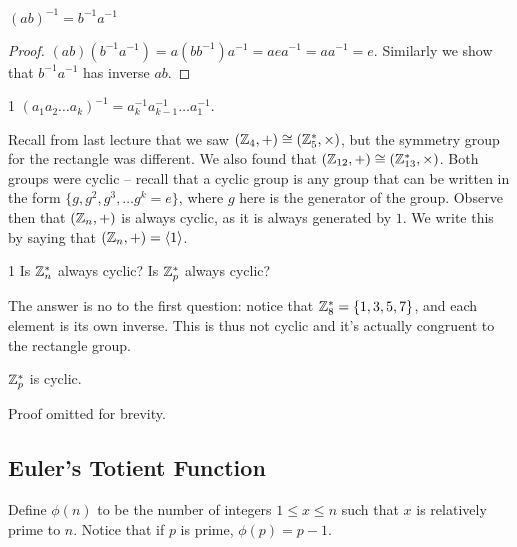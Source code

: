 \begin{theorem}
$(ab)^{-1} = b^{-1}a^{-1}$
\end{theorem}
\begin{proof}
$(ab)(b^{-1}a^{-1}) = a(b b^{-1}) a^{-1} = aea^{-1} = aa^{-1} = e$. Similarly we show that $b^{-1}a^{-1}$ has inverse $ab$. 
\end{proof}

\begin{corollary}1
    $(a_1 a_2 \ldots a_k)^{-1} = a_k^{-1} a_{k-1}^{-1} \ldots a_1^{-1}$. 
\end{corollary}

Recall from last lecture that we saw $(\mathbb{Z}_4, +) \cong (\mathbb{Z}_5^*, \times)$, but the symmetry group for the rectangle was different. We also found that $(\mathbb{Z}_{12}, +) \cong (\mathbb{Z}_{13}^*, \times)$. 
Both groups were cyclic -- recall that a cyclic group is any group that can be written in the form $\{g, g^2, g^3, \ldots g^k = e\}$, where $g$ here is the generator of the group. Observe then that $(\mathbb{Z}_n, +)$ is always cyclic, as it is always generated by $1$. We write this by saying that $(\mathbb{Z}_n, +) = \langle 1 \rangle$. 

\begin{problem}1
    Is $\mathbb{Z}_n^*$ always cyclic? Is $\mathbb{Z}_p^*$ always cyclic? 
\end{problem}
The answer is no to the first question: notice that $\mathbb{Z}_8^* = \{ 1, 3, 5, 7\}$, and each element is its own inverse. This is thus not cyclic and it's actually congruent to the rectangle group. 

\begin{theorem}
$\mathbb{Z}_p^*$ is cyclic.
\end{theorem}
Proof omitted for brevity. 

\subsection{Euler's Totient Function}
Define $\phi(n)$ to be the number of integers $1 \leq x \leq n$ such that $x$ is relatively prime to $n$. Notice that if $p$ is prime, $\phi(p) = p-1$. 

